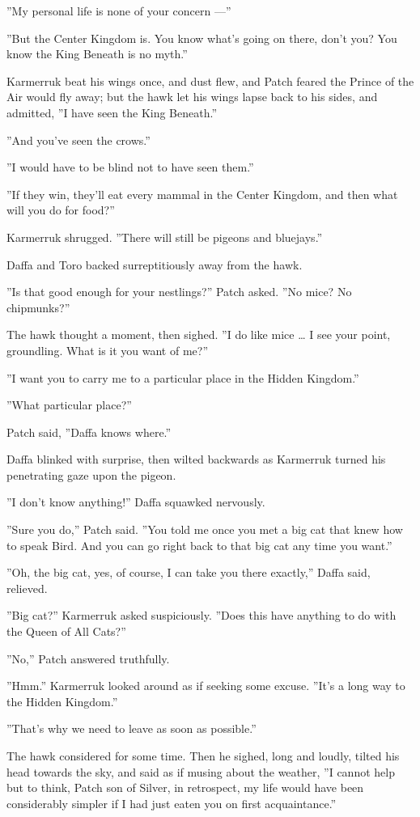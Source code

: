 \documentclass[12pt]{book}
\begin{document}
''My personal life is none of your concern ---''

''But the Center Kingdom is. You know what's going on there, don't
you? You know the King Beneath is no myth.''

Karmerruk beat his wings once, and dust flew, and Patch feared the
Prince of the Air would fly away; but the hawk let his wings lapse
back to his sides, and admitted, ''I have seen the King Beneath.''

''And you've seen the crows.''

''I would have to be blind not to have seen them.''

''If they win, they'll eat every mammal in the Center Kingdom, and
then what will you do for food?''

Karmerruk shrugged. ''There will still be pigeons and bluejays.''

Daffa and Toro backed surreptitiously away from the hawk.

''Is that good enough for your nestlings?'' Patch asked. ''No mice? No
chipmunks?''

The hawk thought a moment, then sighed. ''I do like mice \ldots{} I
see your point, groundling. What is it you want of me?''

''I want you to carry me to a particular place in the Hidden
Kingdom.''

''What particular place?''

Patch said, ''Daffa knows where.''

Daffa blinked with surprise, then wilted backwards as Karmerruk turned
his penetrating gaze upon the pigeon.

''I don't know anything!'' Daffa squawked nervously.

''Sure you do,'' Patch said. ''You told me once you met a big cat that
knew how to speak Bird. And you can go right back to that big cat any
time you want.''

''Oh, the big cat, yes, of course, I can take you there exactly,''
Daffa said, relieved.

''Big cat?'' Karmerruk asked suspiciously. ''Does this have anything
to do with the Queen of All Cats?''

''No,'' Patch answered truthfully.

''Hmm.'' Karmerruk looked around as if seeking some excuse. ''It's a
long way to the Hidden Kingdom.''

''That's why we need to leave as soon as possible.''

The hawk considered for some time. Then he sighed, long and loudly,
tilted his head towards the sky, and said as if musing about the
weather, ''I cannot help but to think, Patch son of Silver, in
retrospect, my life would have been considerably simpler if I had just
eaten you on first acquaintance.''
\end{document}

